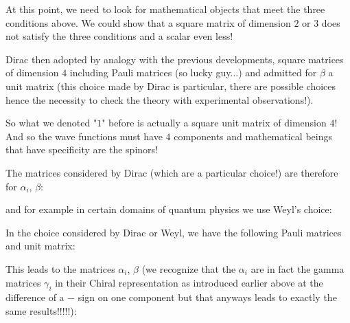 	At this point, we need to look for mathematical objects that meet the three conditions above. We could show that a square matrix of dimension $2$ or $3$ does not satisfy the three conditions and a scalar even less!

	Dirac then adopted by analogy with the previous developments, square matrices of dimension $4$ including Pauli matrices (so lucky guy...) and admitted for $\beta$ a unit matrix (this choice made by Dirac is particular, there are possible choices hence the necessity to check the theory with experimental observations!).

	So what we denoted "$1$" before is actually a square unit matrix of dimension $4$! And so the wave functions must have $4$ components and mathematical beings that have specificity are the spinors!

	The matrices considered by Dirac (which are a particular choice!) are therefore for $\alpha_i$, $\beta$:
	
	and for example in certain domains of quantum physics we use Weyl's choice:
	
	In the choice considered by Dirac or Weyl, we have the following Pauli matrices and unit matrix:
	
	This leads to the matrices $\alpha_i$, $\beta$ (we recognize that the $\alpha_i$ are in fact the gamma matrices $\gamma_i$ in their Chiral representation as introduced earlier above at the difference of a $-$ sign on one component but that anyways leads to exactly the same results!!!!!):
	
